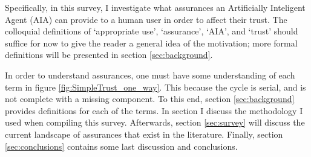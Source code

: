     Specifically, in this survey, I investigate what assurances an Artificially Inteligent Agent (AIA) can provide to a human user in order to affect their trust. The colloquial definitions of `appropriate use', `assurance', `AIA', and `trust' should suffice for now to give the reader a general idea of the motivation; more formal definitions will be presented in section \ref{sec:background}.

    In order to understand assurances, one must have some understanding of each term in figure \ref{fig:SimpleTrust_one_way}. This because the cycle is serial, and is not complete with a missing component. To this end, section \ref{sec:background} provides definitions for each of the terms. In section I discuss the methodology I used when compiling this survey. Afterwards, section \ref{sec:survey} will discuss the current landscape of assurances that exist in the literature. Finally, section \ref{sec:conclusions} contains some last discussion and conclusions.
